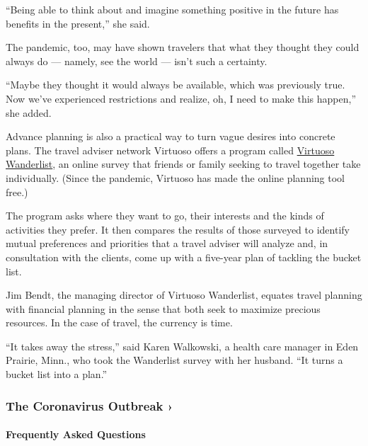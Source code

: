 ``Being able to think about and imagine something positive in the future
has benefits in the present,'' she said.

The pandemic, too, may have shown travelers that what they thought they
could always do --- namely, see the world --- isn't such a certainty.

``Maybe they thought it would always be available, which was previously
true. Now we've experienced restrictions and realize, oh, I need to make
this happen,'' she added.

Advance planning is also a practical way to turn vague desires into
concrete plans. The travel adviser network Virtuoso offers a program
called \href{https://www.virtuoso.com/wanderlist/\#/sign-in}{Virtuoso
Wanderlist}, an online survey that friends or family seeking to travel
together take individually. (Since the pandemic, Virtuoso has made the
online planning tool free.)

The program asks where they want to go, their interests and the kinds of
activities they prefer. It then compares the results of those surveyed
to identify mutual preferences and priorities that a travel adviser will
analyze and, in consultation with the clients, come up with a five-year
plan of tackling the bucket list.

Jim Bendt, the managing director of Virtuoso Wanderlist, equates travel
planning with financial planning in the sense that both seek to maximize
precious resources. In the case of travel, the currency is time.

``It takes away the stress,'' said Karen Walkowski, a health care
manager in Eden Prairie, Minn., who took the Wanderlist survey with her
husband. ``It turns a bucket list into a plan.''

\href{https://www.nytimes3xbfgragh.onion/news-event/coronavirus?action=click\&pgtype=Article\&state=default\&region=MAIN_CONTENT_3\&context=storylines_faq}{}

\hypertarget{the-coronavirus-outbreak-}{%
\subsubsection{The Coronavirus Outbreak
›}\label{the-coronavirus-outbreak-}}

\hypertarget{frequently-asked-questions}{%
\paragraph{Frequently Asked
Questions}\label{frequently-asked-questions}}

